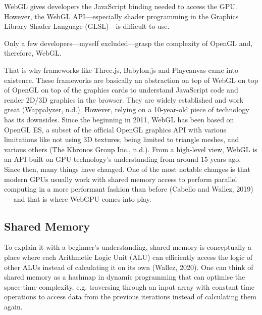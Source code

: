 \documentclass[10pt]{article}
\begin{document}
\begin{sloppypar}
  WebGL gives developers the JavaScript binding needed to access the GPU. However, the WebGL API—especially shader programming in the Graphics Library Shader Language (GLSL)—is difficult to use.

  Only a few developers—myself excluded—grasp the complexity of OpenGL and, therefore, WebGL.

  That is why frameworks like Three.js, Babylon.js and Playcanvas came into existence. These frameworks are basically an abstraction on top of WebGL on top of OpenGL on top of the graphics cards to understand JavaScript code and render 2D/3D graphics in the browser. They are widely established and work great (Wappalyzer, n.d.). However, relying on a 10-year-old piece of technology has its downsides. Since the beginning in 2011, WebGL has been based on OpenGL ES, a subset of the official OpenGL graphics API with various limitations like not using 3D textures, being limited to triangle meshes, and various others (The Khronos Group Inc., n.d.). From a high-level view, WebGL is an API built on GPU technology’s understanding from around 15 years ago. Since then, many things have changed. One of the most notable changes is that modern GPUs usually work with shared memory access to perform parallel computing in a more performant fashion than before (Cabello and Wallez, 2019) — and that is where WebGPU comes into play.

  \subsection{Shared Memory}
  \label{subsec:shared-memory}

  To explain it with a beginner’s understanding, shared memory is conceptually a place where each Arithmetic Logic Unit (ALU) can efficiently access the logic of other ALUs instead of calculating it on its own (Wallez, 2020). One can think of shared memory as a hashmap in dynamic programming that can optimise the space-time complexity, e.g. traversing through an input array with constant time operations to access data from the previous iterations instead of calculating them again.


\end{sloppypar}
\end{document}
